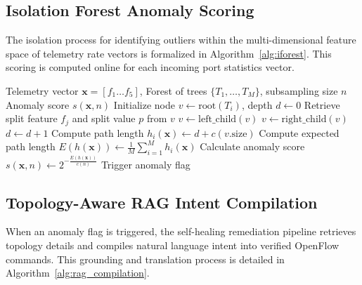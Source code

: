 \documentclass[conference]{IEEEtran}
\begin{document}
\subsection{Isolation Forest Anomaly Scoring}
The isolation process for identifying outliers within the multi-dimensional feature space of telemetry rate vectors is formalized in Algorithm~\ref{alg:iforest}. This scoring is computed online for each incoming port statistics vector.

\begin{algorithm}[h]
\caption{Isolation Forest Anomaly Scoring}
\label{alg:iforest}
\footnotesize
\begin{algorithmic}[1]
\REQUIRE Telemetry vector $\mathbf{x} = [f_1 \dots f_5]$, Forest of trees $\{T_1, \dots, T_M\}$, subsampling size $n$
\ENSURE Anomaly score $s(\mathbf{x}, n)$
    \STATE Initialize node $v \leftarrow \text{root}(T_i)$, depth $d \leftarrow 0$
        \STATE Retrieve split feature $f_j$ and split value $p$ from $v$
            \STATE $v \leftarrow \text{left\_child}(v)$
        \ELSE
            \STATE $v \leftarrow \text{right\_child}(v)$
        \ENDIF
        \STATE $d \leftarrow d + 1$
    \ENDWHILE
    \STATE Compute path length $h_i(\mathbf{x}) \leftarrow d + c(v.\text{size})$
\ENDFOR
\STATE Compute expected path length $E(h(\mathbf{x})) \leftarrow \frac{1}{M} \sum_{i=1}^M h_i(\mathbf{x})$
\STATE Calculate anomaly score $s(\mathbf{x}, n) \leftarrow 2^{-\frac{E(h(\mathbf{x}))}{c(n)}}$
    \STATE Trigger anomaly flag
\ENDIF
\end{algorithmic}
\end{algorithm}

\subsection{Topology-Aware RAG Intent Compilation}
When an anomaly flag is triggered, the self-healing remediation pipeline retrieves topology details and compiles natural language intent into verified OpenFlow commands. This grounding and translation process is detailed in Algorithm~\ref{alg:rag_compilation}.
\end{document}
